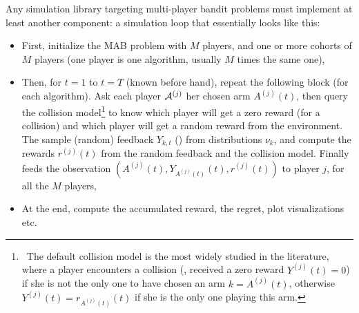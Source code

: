 Any simulation library targeting multi-player bandit problems must implement at least another component:
a simulation loop that essentially looks like this:
\begin{itemize}
    \item First, initialize the MAB problem with $M$ players, and one or more cohorts of $M$ players (one player is one algorithm, usually $M$ times the same one),
    \item Then, for $t=1$ to $t=T$ (known before hand), repeat the following block (for each algorithm). Ask each player $\mathcal{A}^{(j)}$ her chosen arm $A^{(j)}(t)$, then query the collision model\footnote{~The default collision model is the most widely studied in the literature, where a player encounters a collision (\ie, received a zero reward $Y^{(j)}(t)=0$) if she is not the only one to have chosen an arm $k=A^{(j)}(t)$, otherwise $Y^{(j)}(t)=r_{A^{(j)}(t)}(t)$ if she is the only one playing this arm.} to know which player will get a zero reward (for a collision) and which player will get a random reward from the environment. The
    sample (random) feedback $Y_{k,t}$ (\iid) from distributions $\nu_{k}$, and compute the rewards $r^{(j)}(t)$ from the random feedback and the collision model. Finally feeds the observation $(A^{(j)}(t), Y_{A^{(j)}(t)}(t), r^{(j)}(t))$ to player $j$, for all the $M$ players,
    \item At the end, compute the accumulated reward, the regret, plot visualizations etc.
\end{itemize}


